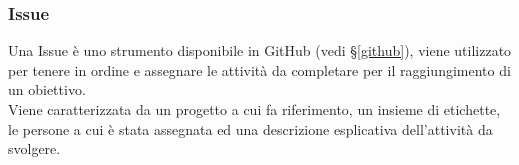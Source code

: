 
\subsubsection*{Issue}
Una Issue è uno strumento disponibile in GitHub (vedi \S\ref{github}), viene
utilizzato per tenere in ordine e assegnare le attività da completare per il
raggiungimento di un obiettivo.\\
Viene caratterizzata da un progetto a cui fa riferimento, un insieme di
etichette, le persone a cui è stata assegnata ed una descrizione esplicativa
dell'attività da svolgere.

\newpage

